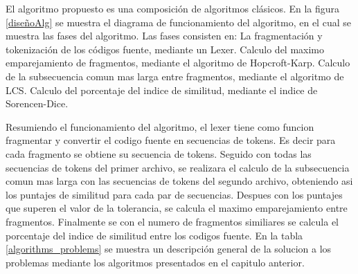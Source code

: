 El algoritmo propuesto es una composición de algoritmos clásicos. En la figura \ref{diseñoAlg} se muestra el diagrama de funcionamiento del algoritmo, en el cual se muestra las fases del algoritmo. Las fases consisten en: La fragmentación y tokenización de los códigos fuente, mediante un Lexer. Calculo del maximo emparejamiento de fragmentos, mediante el algoritmo de Hopcroft-Karp. Calculo de la subsecuencia comun mas larga entre fragmentos, mediante el algoritmo de LCS. Calculo del porcentaje del indice de similitud, mediante el indice de Sorencen-Dice.



Resumiendo el funcionamiento del algoritmo, el lexer tiene como funcion fragmentar y convertir el codigo fuente en secuencias de tokens. Es decir para cada fragmento se obtiene su secuencia de tokens. Seguido con todas las secuencias de tokens del primer archivo, se realizara el calculo de la subsecuencia comun mas larga con las secuencias de tokens del segundo archivo, obteniendo asi los puntajes de similitud para cada par de secuencias. Despues con los puntajes que superen el valor de la tolerancia, se calcula el maximo emparejamiento entre fragmentos. Finalmente se con el numero de fragmentos similiares se calcula el porcentaje del indice de similitud entre los codigos fuente. En la tabla \ref{algorithms_problems} se muestra un descripción general de la solucion a los problemas mediante los algoritmos presentados en el capitulo anterior.


